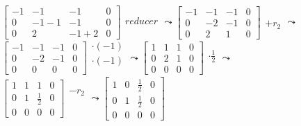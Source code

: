 \documentclass[a4paper,12pt]{article}
\begin{document}
$
\left[\begin{array}{ccc|c}
    -1 & -1 & -1 & 0 \\
    0 & -1-1 & -1 & 0 \\
    0 & 2 & -1+2 & 0
\end{array}\right]
\begin{array}{ccc}
    \\
    reducer\\
    \\
\end{array}
\leadsto
\left[\begin{array}{ccc|c}
    -1 & -1 & -1 & 0 \\
    0 & -2 & -1 & 0 \\
    0 & 2 & 1 & 0
\end{array}\right]
\begin{array}{ccc}
    \\
    \\
    +r_2\\
\end{array}
\leadsto
$\\
$
\left[\begin{array}{ccc|c}
    -1 & -1 & -1 & 0 \\
    0 & -2 & -1 & 0 \\
    0 & 0 & 0 & 0
\end{array}\right]
\begin{array}{ccc}
    \cdot (-1)\\
    \cdot (-1)\\
    \\
\end{array}
\leadsto
\left[\begin{array}{ccc|c}
    1 & 1 & 1 & 0 \\
    0 & 2 & 1 & 0 \\
    0 & 0 & 0 & 0
\end{array}\right]
\begin{array}{ccc}
    \\
    \cdot \frac{1}{2}\\
    \\
\end{array}
\leadsto
$\\
$
\left[\begin{array}{ccc|c}
    1 & 1 & 1 & 0 \\
    0 & 1 & \frac{1}{2} & 0 \\
    0 & 0 & 0 & 0
\end{array}\right]
\begin{array}{ccc}
    -r_2\\
    \\
    \\
\end{array}
\leadsto
\left[\begin{array}{ccc|c}
    1 & 0 & \frac{1}{2} & 0 \\
    0 & 1 & \frac{1}{2} & 0 \\
    0 & 0 & 0 & 0
\end{array}\right]
$\\
\end{document}
